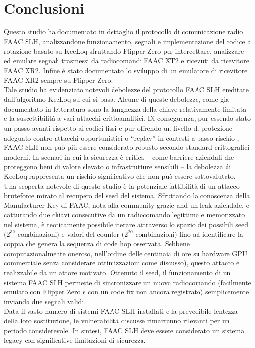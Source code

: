 \chapter{Conclusioni}
\label{cha:conclusions}

Questo studio ha documentato in dettaglio il protocollo di comunicazione radio FAAC SLH, analizzandone funzionamento, segnali e implementazione del codice a rotazione basato su KeeLoq sfruttando Flipper Zero per intercettare, analizzare ed emulare segnali trasmessi da radiocomandi FAAC XT2 e ricevuti da ricevitore FAAC XR2. Infine è stato documentato lo sviluppo di un emulatore di ricevitore FAAC XR2 sempre su Flipper Zero.\\
Tale studio ha evidenziato notevoli debolezze del protocollo FAAC SLH ereditate dall’algoritmo KeeLoq su cui si basa. Alcune di queste debolezze, come già documentato in letteratura sono la lunghezza della chiave relativamente limitata e la suscettibilità a vari attacchi crittoanalitici. Di conseguenza, pur essendo stato un passo avanti rispetto ai codici fissi e pur offrendo un livello di protezione adeguato contro attacchi opportunistici o “replay” in contesti a basso rischio , FAAC SLH non può più essere considerato robusto secondo standard crittografici moderni. In scenari in cui la sicurezza è critica – come barriere aziendali che proteggono beni di valore elevato o infrastrutture sensibili – la debolezza di KeeLoq rappresenta un rischio significativo che non può essere sottovalutato.\\
Una scoperta notevole di questo studio è la potenziale fattibilità di un attacco bruteforce mirato al recupero del seed del sistema. Sfruttando la conoscenza della Manufacturer Key di FAAC, nota alla community grazie and un leak aziendale, e catturando due chiavi consecutive da un radiocomando legittimo e memorizzato nel sistema, è teoricamente possibile iterare attraverso lo spazio dei possibili seed ($2^{32}$ combinazioni) e valori del counter ($2^{20}$ combinazioni) fino ad identificare la coppia che genera la sequenza di code hop osservata. Sebbene computazionalmente oneroso, nell’ordine delle centinaia di ore su hardware GPU commerciale senza considerare ottimizzazioni come discusso), questo attacco è realizzabile da un attore motivato. Ottenuto il seed, il funzionamento di un sistema FAAC SLH permette di sincronizzare un nuovo radiocomando (facilmente emulato con Flipper Zero e con un code fix non ancora registrato) semplicemente inviando due segnali validi.\\
Data il vasto numero di sistemi FAAC SLH installati e la prevedibile lentezza della loro sostituzione, le vulnerabilità discusse rimarranno rilevanti per un periodo considerevole. In sintesi, FAAC SLH deve essere considerato un sistema legacy con significative limitazioni di sicurezza.
